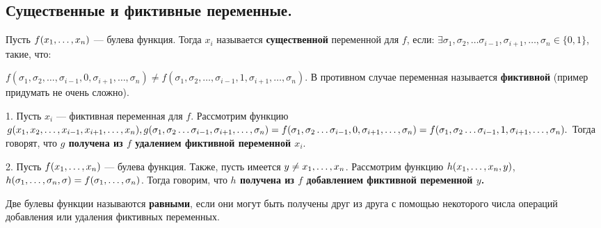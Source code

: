 \subsection{Существенные и фиктивные переменные.} 
\begin{definition}
	Пусть $f(x_1, \ldots, x_n)$ --- булева функция. 
	Тогда $x_i$ называется \textbf{существенной} переменной для $f$, если:  $\exists{\sigma_1,\sigma_2, \ldots \sigma_{i-1}, \sigma_{i+1}, \ldots, \sigma_{n}}\in\{0,1\}$, такие, что: 

$ f(\sigma_1,\sigma_2, \ldots ,\sigma_{i-1}, 0, \sigma_{i+1}, \ldots, \sigma_{n})\neq f(\sigma_1,\sigma_2, \ldots, \sigma_{i-1}, 1, \sigma_{i+1}, \ldots, \sigma_{n}).$
	В противном случае переменная называется \textbf{фиктивной} (пример придумать не очень сложно).
\end{definition}

1. Пусть $x_i$ --- фиктивная переменная для $f$. Рассмотрим функцию $g(x_1,x_2,\ldots,x_{i-1},x_{i+1}, \ldots, x_{n}),\\
    g(\sigma_1,\sigma_2 \ldots \sigma_{i-1}, \sigma_{i+1}, \ldots, \sigma_{n})=f(\sigma_1,\sigma_2 \ldots \sigma_{i-1},0, \sigma_{i+1}, \ldots, \sigma_{n}) =f(\sigma_1,\sigma_2 \ldots \sigma_{i-1},1, \sigma_{i+1}, \ldots, \sigma_{n}). $ Тогда говорят, что  \textbf{$g$ получена из $f$ удалением фиктивной переменной $x_i$}.

2. Пусть $f(x_1, \ldots, x_n)$ --- булева функция. Также, пусть имеется $y \neq x_1, \ldots, x_n $. Рассмотрим функцию $h(x_1, \ldots, x_n,y)$, $h(\sigma_1, \ldots, \sigma_n,\sigma)=f(\sigma_1, \ldots, \sigma_n)$. Тогда говорим, что \textbf{$h$ получена из $f$ добавлением фиктивной переменной  $y$.}

\begin{definition}
	Две булевы функции называются \textbf{равными}, если они могут быть получены друг из друга с помощью некоторого числа операций добавления или удаления фиктивных переменных. \\
\end{definition}

